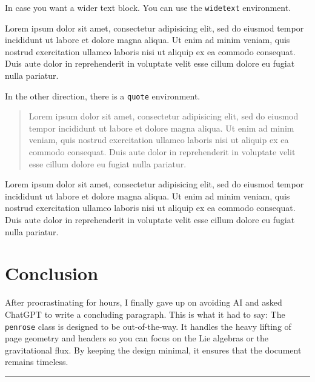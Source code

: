 \documentclass[11pt]{penrose}
\begin{document}
In case you want a wider text block. You can use the \texttt{widetext} environment.

\begin{widetext}
  Lorem ipsum dolor sit amet, consectetur adipisicing elit, sed do eiusmod tempor incididunt ut labore et dolore magna aliqua. Ut enim ad minim veniam, quis nostrud exercitation ullamco laboris nisi ut aliquip ex ea commodo consequat. Duis aute dolor in reprehenderit in voluptate velit esse cillum dolore eu fugiat nulla pariatur.
\end{widetext}

In the other direction, there is a \texttt{quote} environment.

\begin{quote}
  Lorem ipsum dolor sit amet, consectetur adipisicing elit, sed do eiusmod tempor incididunt ut labore et dolore magna aliqua. Ut enim ad minim veniam, quis nostrud exercitation ullamco laboris nisi ut aliquip ex ea commodo consequat. Duis aute dolor in reprehenderit in voluptate velit esse cillum dolore eu fugiat nulla pariatur.
\end{quote}

Lorem ipsum dolor sit amet, consectetur adipisicing elit, sed do eiusmod tempor incididunt ut labore et dolore magna aliqua. Ut enim ad minim veniam, quis nostrud exercitation ullamco laboris nisi ut aliquip ex ea commodo consequat. Duis aute dolor in reprehenderit in voluptate velit esse cillum dolore eu fugiat nulla pariatur.

\section{Conclusion}
After procrastinating for hours, I finally gave up on avoiding AI and asked ChatGPT to write a concluding paragraph. This is what it had to say: The \texttt{penrose} class is designed to be out-of-the-way. It handles the heavy lifting of page geometry and headers so you can focus on the Lie algebras or the gravitational flux. By keeping the design minimal, it ensures that the document remains timeless.

\begin{center}
  \vspace*{0.5em}\rule{0.8\textwidth}{0.8pt}
\end{center}

\nocite{*}
{\small}
\end{document}
